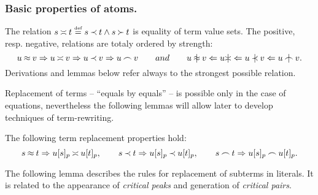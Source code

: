 \subsubsection{Basic properties of atoms.}
%
The relation \(s\mathbin{\asymp} t\mathrel {\stackrel {\mbox {\tiny def}}{=}} s\mathbin{\prec} t\land s\mathbin{\succ} t\) is equality of
term value sets.
%
\noindent
The positive, resp. negative, relations are totaly ordered by strength:
\begin{equation} \label{eq:rel-order}
u\Eq v  \impl u\Seteq v \impl u\Incl v \impl u\Int v
\hspace{2em} and \hspace{2em}
 u\notEq v \Leftarrow u \notSeteq \Leftarrow
 u\notIncl v \Leftarrow u\notInt v. 
\end{equation}
Derivations and lemmas below refer always to the strongest possible relation.
%

Replacement of terms --
``equals by equals'' -- is possible only in the case of equations, nevertheless
the following lemmas will allow later to develop techniques of term-rewriting.
%

 \begin{lemma}\label{le:replacement}
The following term replacement properties hold: %
\begin{equation}\label{eq:rep}
s\Eq t  \impl   u[s]_p \Seteq  u[t]_p,\ \ \ \ \ \ 
s\Incl t  \impl  u[s]_p \Incl  u[t]_p,\ \ \ \ \ \  
s\Int t \impl  u[s]_p \Int  u[t]_p.
\end{equation}
 \end{lemma}
%
The following lemma describes  the rules for replacement of
subterms in literals. It is related to the appearance of
{\em critical peaks} \cite{Der} and generation of {\em
critical pairs}.
%

